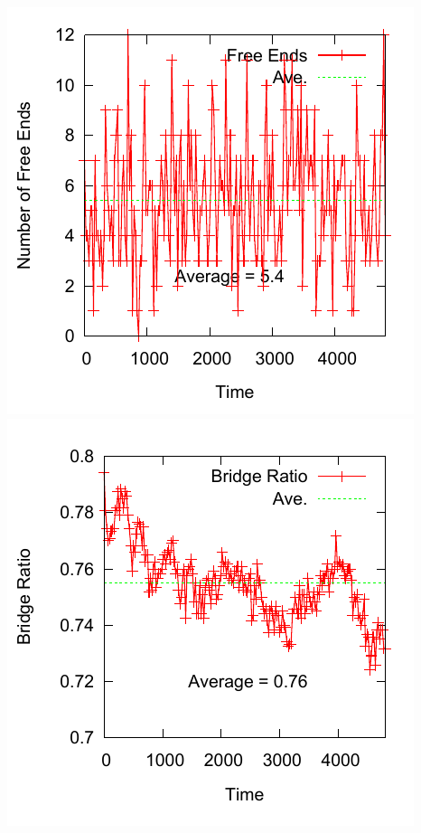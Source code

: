 \documentclass[12pt, dvipdfmx]{beamer}
\begin{document}
\begin{frame}
\begin{columns}[T, totalwidth=\linewidth]
		\includegraphics[width=\columnwidth]{./fig/AB70/Free_Ends.pdf}
		\includegraphics[width=\columnwidth]{./fig/AB70/B_ratio.pdf}
\end{columns}

\end{frame}
\end{document}
